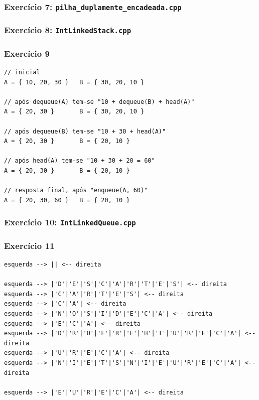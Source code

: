 \documentclass[aspectratio=169]{beamer}
\begin{document}
\begin{frame}[fragile]\frametitle{Exercício 7: \texttt{pilha\_duplamente\_encadeada.cpp}}
\fontsize{5pt}{5pt}\selectfont{

}
\end{frame}

\begin{frame}[fragile]\frametitle{Exercício 8: \texttt{IntLinkedStack.cpp}}
\fontsize{3pt}{5pt}\selectfont{

}
\end{frame}

\begin{frame}[fragile]\frametitle{Exercício 9}
\small{
\begin{verbatim}
// inicial
A = { 10, 20, 30 }   B = { 30, 20, 10 }

// após dequeue(A) tem-se "10 + dequeue(B) + head(A)"
A = { 20, 30 }       B = { 30, 20, 10 }

// após dequeue(B) tem-se "10 + 30 + head(A)"
A = { 20, 30 }       B = { 20, 10 }

// após head(A) tem-se "10 + 30 + 20 = 60"
A = { 20, 30 }       B = { 20, 10 }

// resposta final, após "enqueue(A, 60)"
A = { 20, 30, 60 }   B = { 20, 10 }
\end{verbatim}
}
\end{frame}

\begin{frame}[fragile]\frametitle{Exercício 10: \texttt{IntLinkedQueue.cpp}}
\fontsize{3pt}{5pt}\selectfont{

}
\end{frame}

\begin{frame}[fragile]\frametitle{Exercício 11}
\small{
\begin{verbatim}
esquerda --> || <-- direita

esquerda --> |'D'|'E'|'S'|'C'|'A'|'R'|'T'|'E'|'S'| <-- direita
esquerda --> |'C'|'A'|'R'|'T'|'E'|'S'| <-- direita
esquerda --> |'C'|'A'| <-- direita
esquerda --> |'N'|'O'|'S'|'I'|'D'|'E'|'C'|'A'| <-- direita
esquerda --> |'E'|'C'|'A'| <-- direita
esquerda --> |'D'|'R'|'O'|'F'|'R'|'E'|'H'|'T'|'U'|'R'|'E'|'C'|'A'| <-- direita
esquerda --> |'U'|'R'|'E'|'C'|'A'| <-- direita
esquerda --> |'N'|'I'|'E'|'T'|'S'|'N'|'I'|'E'|'U'|'R'|'E'|'C'|'A'| <-- direita

esquerda --> |'E'|'U'|'R'|'E'|'C'|'A'| <-- direita
\end{verbatim}
}
\end{frame}
\end{document}
